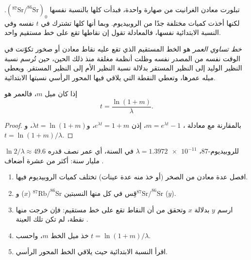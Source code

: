 تبلورت معادن الغرانيت من صهارة واحدة، فبدأت كلها
بالنسبة نفسها $(^{87}\mathrm{Sr}/^{86}\mathrm{Sr})_0$. لكنها أخذت
كميات مختلفة جدًا من الروبيديوم. وبما أنها كلها تشترك في $t$ نفسه وفي النسبة الابتدائية نفسها،
فالمعادلة تقول إن نقاطها تقع على خط مستقيم واحد.

\begin{definition}\label{def:g12:age-of-the-earth:isochron}
\emph{خط تساوي العمر} هو الخط المستقيم الذي تقع عليه
نقاط معادن أو صخور تكوّنت في الوقت نفسه من المصدر
نفسه وظلت أنظمة مغلقة منذ ذلك الحين، حين تُرسم نسبة النظير الوليد إلى
النظير المستقر بدلالة نسبة النظير الأم إلى النظير المستقر. ويعطي
ميله عمرها، وتعطي النقطة التي يلاقي فيها المحور الرأسي
نسبتها الابتدائية.
\end{definition}

\begin{proposition}\label{prop:g12:age-of-the-earth:slope}
إذا كان ميل  $m$، فالعمر هو
\[
  t = \frac{\ln(1+m)}{\lambda}.
\]
\end{proposition}

\begin{proof}
بالمقارنة مع معادلة ، $m = e^{\lambda t} - 1$، إذن
$e^{\lambda t} = 1 + m$، و$\lambda t = \ln(1+m)$، و$t = \ln(1+m)/\lambda$.
\end{proof}

للروبيديوم-87، $\lambda = \num{1.3972e-11}$ في السنة، أي عمر نصف قدره
$\ln 2/\lambda \approx 49.6$ مليار سنة: أكثر من عشرة أضعاف .

\begin{method}\label{met:g12:age-of-the-earth:isochron}
\begin{enumerate}
  \item افصل عدة معادن من الصخر (أو خذ منه عدة
        عينات) تختلف كميات الروبيديوم فيها.
  \item قِس في كل منها النسبتين $^{87}\mathrm{Rb}/^{86}\mathrm{Sr}$ ($x$)
        و$^{87}\mathrm{Sr}/^{86}\mathrm{Sr}$ ($y$).
  \item ارسم $y$ بدلالة $x$ وتحقق من أن النقاط تقع على خط
        مستقيم: فإن خرجت منها نقطة، لم تكن تلك العينة .
  \item خذ ميل الخط $m$، واحسب $t = \ln(1+m)/\lambda$.
  \item اقرأ النسبة الابتدائية حيث يلاقي الخط المحور الرأسي.
\end{enumerate}
\end{method}

